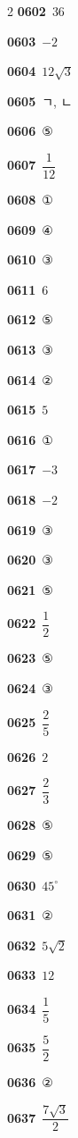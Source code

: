 \documentclass[10pt,a4paper]{article}
\begin{document}
\begin{multicols}{2}
\noindent\textbf{0602}\ $36$\par
\noindent\textbf{0603}\ $-2$\par
\noindent\textbf{0604}\ $12\sqrt{3}$\par
\noindent\textbf{0605}\ ㄱ, ㄴ\par
\noindent\textbf{0606}\ ⑤\par
\noindent\textbf{0607}\ $\dfrac{1}{12}$\par
\noindent\textbf{0608}\ ①\par
\noindent\textbf{0609}\ ④\par
\noindent\textbf{0610}\ ③\par
\noindent\textbf{0611}\ $6$\par
\noindent\textbf{0612}\ ⑤\par
\noindent\textbf{0613}\ ③\par
\noindent\textbf{0614}\ ②\par
\noindent\textbf{0615}\ $5$\par
\noindent\textbf{0616}\ ①\par
\noindent\textbf{0617}\ $-3$\par
\noindent\textbf{0618}\ $-2$\par
\noindent\textbf{0619}\ ③\par
\noindent\textbf{0620}\ ③\par
\noindent\textbf{0621}\ ⑤\par
\noindent\textbf{0622}\ $\dfrac{1}{2}$\par
\noindent\textbf{0623}\ ⑤\par
\noindent\textbf{0624}\ ③\par
\noindent\textbf{0625}\ $\dfrac{2}{5}$\par
\noindent\textbf{0626}\ $2$\par
\noindent\textbf{0627}\ $\dfrac{2}{3}$\par
\noindent\textbf{0628}\ ⑤\par
\noindent\textbf{0629}\ ⑤\par
\noindent\textbf{0630}\ $45^\circ$\par
\noindent\textbf{0631}\ ②\par
\noindent\textbf{0632}\ $5\sqrt{2}$\par
\noindent\textbf{0633}\ $12$\par
\noindent\textbf{0634}\ $\dfrac{1}{5}$\par
\noindent\textbf{0635}\ $\dfrac{5}{2}$\par
\noindent\textbf{0636}\ ②\par
\noindent\textbf{0637}\ $\dfrac{7\sqrt{3}}{2}$\par

\end{multicols}
\end{document}
